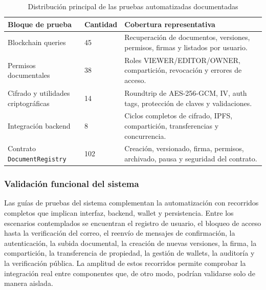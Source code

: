 \documentclass[11pt, a4paper]{article}
\begin{document}
\begin{table}[H]
    \centering
    \small
    \begin{tabular}{|p{4cm}|p{2cm}|p{6.8cm}|}
    \hline
    \textbf{Bloque de prueba} & \textbf{Cantidad} & \textbf{Cobertura representativa} \\
    \hline
    Blockchain queries & 45 & Recuperación de documentos, versiones, permisos, firmas y listados por usuario. \\
    \hline
    Permisos documentales & 38 & Roles VIEWER/EDITOR/OWNER, compartición, revocación y errores de acceso. \\
    \hline
    Cifrado y utilidades criptográficas & 14 & Roundtrip de AES-256-GCM, IV, auth tags, protección de claves y validaciones. \\
    \hline
    Integración backend & 8 & Ciclos completos de cifrado, IPFS, compartición, transferencias y concurrencia. \\
    \hline
    Contrato \texttt{DocumentRegistry} & 102 & Creación, versionado, firma, permisos, archivado, pausa y seguridad del contrato. \\
    \hline
    \end{tabular}
    \caption{Distribución principal de las pruebas automatizadas documentadas}
    \label{tab:pruebas-automatizadas}
\end{table}

\subsubsection{Validación funcional del sistema}

Las guías de pruebas del sistema complementan la automatización con recorridos completos que implican interfaz, backend, wallet y persistencia. Entre los escenarios contemplados se encuentran el registro de usuario, el bloqueo de acceso hasta la verificación del correo, el reenvío de mensajes de confirmación, la autenticación, la subida documental, la creación de nuevas versiones, la firma, la compartición, la transferencia de propiedad, la gestión de wallets, la auditoría y la verificación pública. La amplitud de estos recorridos permite comprobar la integración real entre componentes que, de otro modo, podrían validarse solo de manera aislada.
\end{document}
